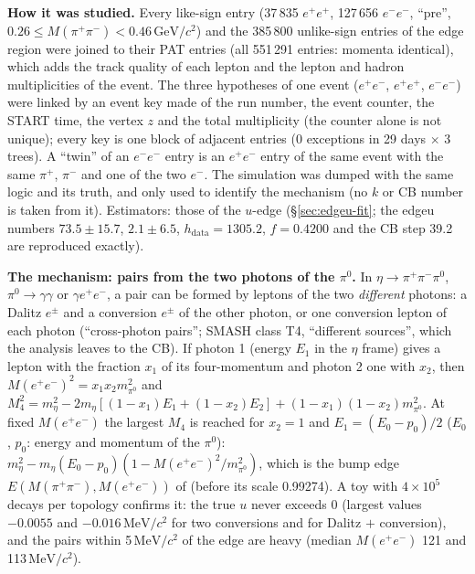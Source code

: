 \documentclass[11pt,a4paper]{article}
\newcommand{\piz}{\ensuremath{\pi^{0}}\xspace}
\newcommand{\pipi}{\ensuremath{\pi^{+}\pi^{-}}\xspace}
\newcommand{\Mee}{\ensuremath{M(e^{+}e^{-})}\xspace}
\newcommand{\Mpipi}{\ensuremath{M(\pi^{+}\pi^{-})}\xspace}
\newcommand{\GeVcc}{\ensuremath{\mathrm{GeV}/c^{2}}\xspace}
\newcommand{\MeVcc}{\ensuremath{\mathrm{MeV}/c^{2}}\xspace}
\newcommand{\code}[1]{\texttt{\detokenize{#1}}}
\begin{document}
\textbf{How it was studied.} Every like-sign entry (37\,835 $e^+e^+$, 127\,656 $e^-e^-$, ``pre'', $0.26\le\Mpipi<0.46$\,\GeVcc) and the
385\,800 unlike-sign entries of the edge region were joined to their PAT entries (all 551\,291 entries: momenta identical), which adds the track
quality of each lepton and the lepton and hadron multiplicities of the event. The three hypotheses of one event ($e^+e^-$, $e^+e^+$, $e^-e^-$)
were linked by an event key made of the run number, the event counter, the START time, the vertex $z$ and the total multiplicity (the counter
alone is not unique); every key is one block of adjacent entries (0 exceptions in 29 days $\times$ 3 trees). A ``twin'' of an $e^-e^-$ entry is an
$e^+e^-$ entry of the same event with the same $\pi^+$, $\pi^-$ and one of the two $e^-$. The simulation was dumped with the same logic and its
truth, and only used to identify the mechanism (no $k$ or CB number is taken from it). Estimators: those of the $u$-edge (\S\ref{sec:edgeu-fit};
the edgeu numbers $73.5\pm15.7$, $2.1\pm6.5$, $h_{\mathrm{data}}=1305.2$, $f=0.4200$ and the CB step 39.2 are reproduced exactly).

\textbf{The mechanism: pairs from the two photons of the \piz.} In $\eta\to\pipi\piz$, $\piz\to\gamma\gamma$ or $\gamma e^+e^-$, a pair can be formed
by leptons of the two \emph{different} photons: a Dalitz $e^\pm$ and a conversion $e^\pm$ of the other photon, or one conversion lepton of each
photon (``cross-photon pairs''; SMASH class T4, ``different sources'', which the analysis leaves to the CB). If photon 1 (energy $E_1$ in the $\eta$
frame) gives a lepton with the fraction $x_1$ of its four-momentum and photon 2 one with $x_2$, then $\Mee^2=x_1x_2m_{\piz}^2$ and
$M_4^2=m_\eta^2-2m_\eta[(1-x_1)E_1+(1-x_2)E_2]+(1-x_1)(1-x_2)m_{\piz}^2$. At fixed \Mee the largest $M_4$ is reached for $x_2=1$ and
$E_1=(E_0-p_0)/2$ ($E_0$, $p_0$: energy and momentum of the \piz): $m_\eta^2-m_\eta(E_0-p_0)(1-\Mee^2/m_{\piz}^2)$, which is the bump edge
$E(\Mpipi,\Mee)$ of \code{defs.h} (before its scale 0.99274). A toy with $4\times10^5$ decays per topology confirms it: the true $u$ never exceeds
0 (largest values $-0.0055$ and $-0.016$\,\MeVcc for two conversions and for Dalitz $+$ conversion), and the pairs within 5\,\MeVcc of the edge
are heavy (median \Mee 121 and 113\,\MeVcc).
\end{document}
